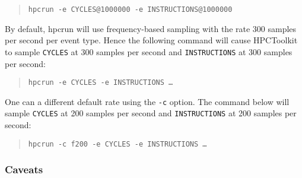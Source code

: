 \begin{quote}
\begin{verbatim}
hpcrun -e CYCLES@1000000 -e INSTRUCTIONS@1000000
\end{verbatim}
\end{quote}

By default, hpcrun will use frequency-based sampling with the rate
300 samples per second per event type. Hence the following command will cause HPCToolkit to
sample \verb|CYCLES| at 300 samples per second and \verb|INSTRUCTIONS| at 300 samples per second:

\begin{quote}
\begin{verbatim}
hpcrun -e CYCLES -e INSTRUCTIONS …
\end{verbatim}
\end{quote}

One can a different default rate using the \verb|-c| option. The command below will sample \verb|CYCLES| at 200 samples per second and \verb|INSTRUCTIONS| at 200 samples per second:

\begin{quote}
\begin{verbatim}
hpcrun -c f200 -e CYCLES -e INSTRUCTIONS …
\end{verbatim}
\end{quote}



\subsubsection{Caveats}

